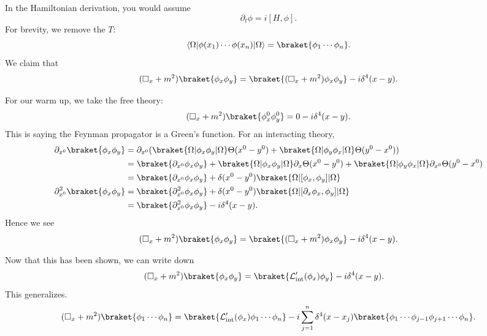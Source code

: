 \documentclass[12pt]{article}
\begin{document}
In the Hamiltonian derivation, you would assume
\[
	\partial_t \phi = i [H, \phi].
\]
For brevity, we remove the $T$:
\[
	\langle \Omega | \phi(x_1) \cdots \phi(x_n) | \Omega \rangle = \braket{ \phi_1 \cdots \phi_n}.
\]
We claim that
\[
	(\square_x + m^2) \braket{\phi_x \phi_y} = \braket{ (\square_x + m^2)\phi_x \phi_y} - i \delta^{4}(x - y).
\]
\begin{proofbox}
	For our warm up, we take the free theory:
	\[
		(\square _x + m^2) \braket{\phi_x^0 \phi_y^0} = 0 - i \delta^{4}(x - y).
	\]
	This is saying the Feynman propagator is a Green's function. For an interacting theory,
	\begin{align*}
		\partial_{x^0} \braket{\phi_x \phi_y} &= \partial_{x^0} ( \braket{\Omega | \phi_x \phi_y | \Omega} \Theta(x^0 - y^0) + \braket{\Omega | \phi_y \phi_x | \Omega} \Theta(y^0 - x^0) ) \\
						      &= \braket{\partial_{x^0} \phi_x \phi_y} + \braket{\Omega | \phi_x \phi_y | \Omega} \partial_x \Theta(x^{0} - y^{0}) + \braket{\Omega| \phi_y \phi_x|\Omega} \partial_{x^{0}} \Theta(y^{0} - x^{0}) \\
						      &= \braket{\partial_{x^0} \phi_x \phi_y} + \delta(x^0-y^0) \braket{\Omega|[\phi_x, \phi_y]|\Omega} \\
		\partial_{x^0}^2\braket{\phi_x \phi_y} &= \braket{\partial_{x^0}^2 \phi_x \phi_y} + \delta(x^0 - y^0) \braket{\Omega | [\partial_x \phi_x, \phi_y] | \Omega} \\
						       &= \braket{\partial_{x^0}^2 \phi_x \phi_y} - i \delta^{4}(x - y).
	\end{align*}
	Hence we see
	\[
		(\square_x + m^2) \braket{\phi_x \phi_y} = \braket{(\square_x + m^2)\phi_x \phi_y} - i \delta^{4}(x - y).
	\]
\end{proofbox}

Now that this has been shown, we can write down
\begin{align*}
	(\square_x + m^2)\braket{\phi_x \phi_y} &= \braket{ \mathcal{L}_{\mathrm{int}}'(\phi_x) \phi_y} - i \delta^{4}(x - y).
\end{align*}
This generalizes.
\[
	(\square_x + m^2) \braket{\phi_1 \cdots \phi_n} = \braket{ \mathcal{L}_{\mathrm{int}}'(\phi_x) \phi_1 \cdots \phi_n } - i \sum_{j = 1}^n \delta^{4}(x - x_j) \braket{\phi_1 \cdots \phi_{j-1} \phi_{j+1} \cdots \phi_n}.
\]
\end{document}
